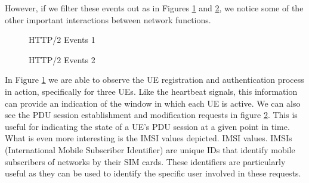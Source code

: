 \documentclass[final,1p,times,authoryear]{elsarticle}
\begin{document}
\vspace{1em}

However, if we filter these events out  as in Figures \ref{fig:non-nrf-events-1} and \ref{fig:non-nrf-events-2}, we notice some of the other important interactions between network functions.

\begin{figure}[H]
  \centering
  \caption{HTTP/2 Events 1}
  \label{fig:non-nrf-events-1}
\end{figure}

\begin{figure}[H]
  \centering
  \caption{HTTP/2 Events 2}
  \label{fig:non-nrf-events-2}
\end{figure}

In Figure \ref{fig:non-nrf-events-1}  we are able to observe the UE registration and authentication process in action, specifically for three UEs. Like the heartbeat signals, this information can provide an indication of the window in which each UE is active. We can also see the PDU session establishment and modification requests in figure \ref{fig:non-nrf-events-2}. This is useful for indicating the state of a UE's PDU session at a given point in time. What is even more interesting is the IMSI values depicted. IMSI values. IMSIs (International Mobile Subscriber Identifier) are unique IDs that identify mobile subscribers of networks by their SIM cards. These identifiers are particularly useful as they can be used to identify the specific user involved in these requests.
\end{document}
